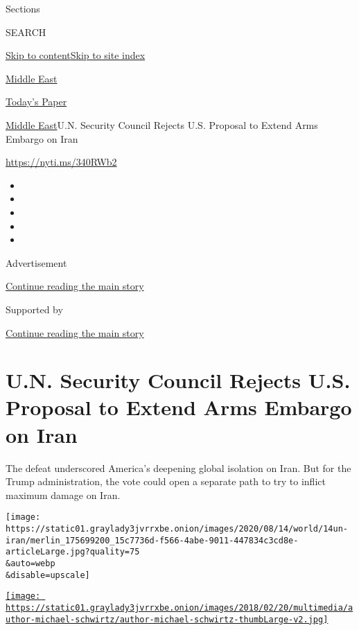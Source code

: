 Sections

SEARCH

\protect\hyperlink{site-content}{Skip to
content}\protect\hyperlink{site-index}{Skip to site index}

\href{https://www.nytimes3xbfgragh.onion/section/world/middleeast}{Middle
East}

\href{https://myaccount.nytimes3xbfgragh.onion/auth/login?response_type=cookie\&client_id=vi}{}

\href{https://www.nytimes3xbfgragh.onion/section/todayspaper}{Today's
Paper}

\href{/section/world/middleeast}{Middle East}\textbar{}U.N. Security
Council Rejects U.S. Proposal to Extend Arms Embargo on Iran

\url{https://nyti.ms/340RWb2}

\begin{itemize}
\item
\item
\item
\item
\item
\end{itemize}

Advertisement

\protect\hyperlink{after-top}{Continue reading the main story}

Supported by

\protect\hyperlink{after-sponsor}{Continue reading the main story}

\hypertarget{un-security-council-rejects-us-proposal-to-extend-arms-embargo-on-iran}{%
\section{U.N. Security Council Rejects U.S. Proposal to Extend Arms
Embargo on
Iran}\label{un-security-council-rejects-us-proposal-to-extend-arms-embargo-on-iran}}

The defeat underscored America's deepening global isolation on Iran. But
for the Trump administration, the vote could open a separate path to try
to inflict maximum damage on Iran.

\texttt{[image: https://static01.graylady3jvrrxbe.onion/images/2020/08/14/world/14un-iran/merlin\_175699200\_15c7736d-f566-4abe-9011-447834c3cd8e-articleLarge.jpg?quality=75\\\&auto=webp\\\&disable=upscale]}

\href{https://www.nytimes3xbfgragh.onion/by/michael-schwirtz}{\texttt{[image: https://static01.graylady3jvrrxbe.onion/images/2018/02/20/multimedia/author-michael-schwirtz/author-michael-schwirtz-thumbLarge-v2.jpg]}}

